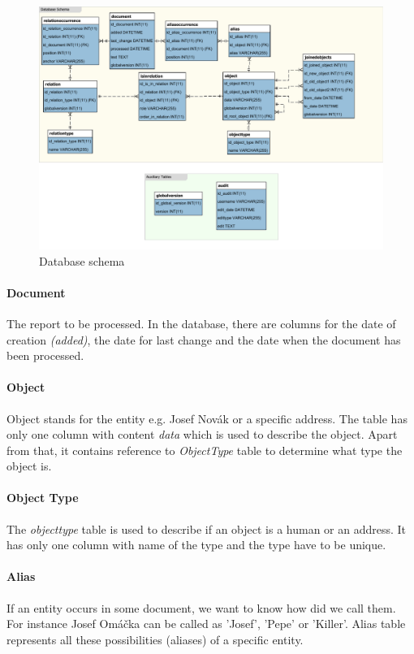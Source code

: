 \begin{figure}[!htb]
        \centering
        \includegraphics[width=\textwidth]{Images/DatabaseSchema}
        \caption{Database schema}
        \label{fig:DatabaseSchema}
\end{figure}

\paragraph{Document} The report to be processed. In the database, there are columns for the date of 
creation \emph{(added)}, the date for last change and the date when the document has been processed.

\paragraph{Object} Object stands for the entity e.g. Josef Novák or a specific address. 
The table has only one column with content \emph{data} which is used to describe the object. 
Apart from that, it contains reference to \emph{ObjectType} table to determine what type the object is.

\paragraph{Object Type} The \emph{objecttype} table is used to describe if an object is a human or an address. 
It has only one column with name of the type and the type have to be unique.

\paragraph{Alias} If an entity occurs in some document, we want to 
know how did we call them. For instance Josef Omáčka can be called as 'Josef', 
'Pepe' or 'Killer'. Alias table represents all these possibilities (aliases) 
of a specific entity.

